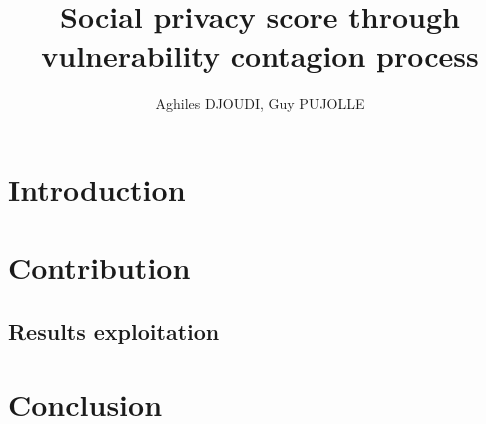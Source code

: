 \documentclass[8pt]{beamer}
\begin{document}
\title{Social privacy score through vulnerability contagion process}
\author{Aghiles DJOUDI, Guy PUJOLLE}

\firstpage

\section{Introduction}
	
	
	
	
	

\tableofcontent

\section{Contribution}
		
		
		
		
		
		
	\subsection{Results exploitation}
		
		
		
\section{Conclusion}
	


\frameBibliography
\end{document}
